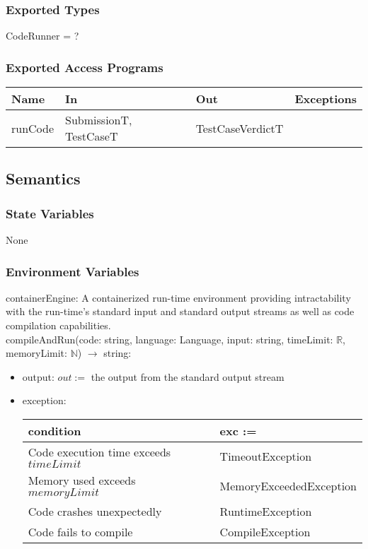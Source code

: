 \documentclass[12pt, titlepage]{article}
\begin{document}
\subsubsection{Exported Types}

CodeRunner = ?

\subsubsection{Exported Access Programs}

\begin{center}
\begin{tabular}{|p{2cm} | p{4cm} | p{4cm} | p{3cm} |}
\hline
\textbf{Name} & \textbf{In} & \textbf{Out} & \textbf{Exceptions} \\

\hline
runCode & SubmissionT, TestCaseT & TestCaseVerdictT & \\
\hline
\end{tabular}
\end{center}

\subsection{Semantics}

\subsubsection{State Variables}

None

\subsubsection{Environment Variables}

containerEngine: A containerized run-time environment providing intractability with the run-time's standard input and standard output streams as well as code compilation capabilities.\\
compileAndRun(code: string, language: Language, input: string, timeLimit: $\mathbb{R}$, memoryLimit: $\mathbb{N}$) $\rightarrow$ string:
\begin{itemize}
    \item output: $out := $ the output from the standard output stream
    \item exception: \begin{tabular}{p{5cm} p{4cm}}
    \hline
    \textbf{condition} & \textbf{exc :=} \\
    \hline
    Code execution time exceeds $timeLimit$ & TimeoutException \\
    Memory used exceeds $memoryLimit$ & MemoryExceededException \\
    Code crashes unexpectedly & RuntimeException \\
    Code fails to compile & CompileException \\
    \hline
    \end{tabular}
\end{itemize}
\end{document}
